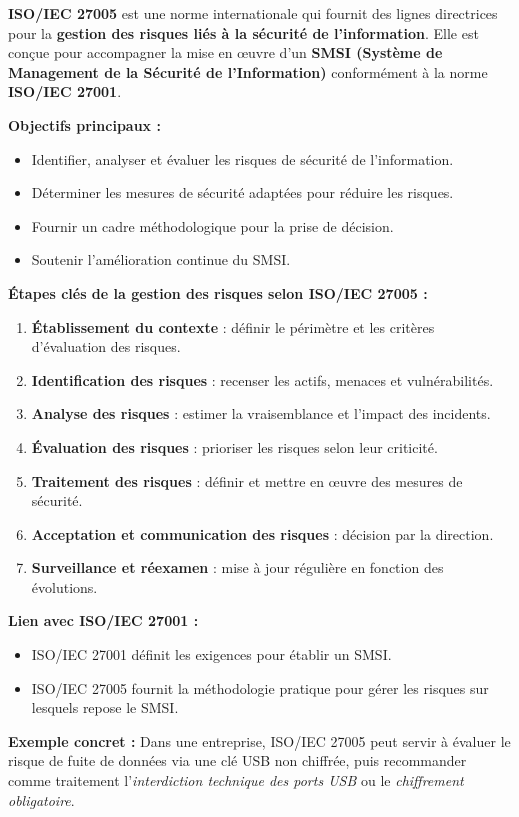 \documentclass[a4paper,11pt]{article}
\begin{document}
\begin{tcolorbox}[colback=teal!5,colframe=teal!60!black,title=Qu'est-ce que l'ISO/IEC 27005 ?]

\textbf{ISO/IEC 27005} est une norme internationale qui fournit des lignes directrices 
pour la \textbf{gestion des risques liés à la sécurité de l’information}.  
Elle est conçue pour accompagner la mise en œuvre d’un \textbf{SMSI (Système de Management de la Sécurité de l’Information)} 
conformément à la norme \textbf{ISO/IEC 27001}.  

\medskip
\textbf{Objectifs principaux :}
\begin{itemize}
  \item Identifier, analyser et évaluer les risques de sécurité de l’information.
  \item Déterminer les mesures de sécurité adaptées pour réduire les risques.
  \item Fournir un cadre méthodologique pour la prise de décision.
  \item Soutenir l’amélioration continue du SMSI.
\end{itemize}

\medskip
\textbf{Étapes clés de la gestion des risques selon ISO/IEC 27005 :}
\begin{enumerate}
  \item \textbf{Établissement du contexte} : définir le périmètre et les critères d’évaluation des risques.
  \item \textbf{Identification des risques} : recenser les actifs, menaces et vulnérabilités.
  \item \textbf{Analyse des risques} : estimer la vraisemblance et l’impact des incidents.
  \item \textbf{Évaluation des risques} : prioriser les risques selon leur criticité.
  \item \textbf{Traitement des risques} : définir et mettre en œuvre des mesures de sécurité.
  \item \textbf{Acceptation et communication des risques} : décision par la direction.
  \item \textbf{Surveillance et réexamen} : mise à jour régulière en fonction des évolutions.
\end{enumerate}

\medskip
\textbf{Lien avec ISO/IEC 27001 :}
\begin{itemize}
  \item ISO/IEC 27001 définit les exigences pour établir un SMSI.
  \item ISO/IEC 27005 fournit la méthodologie pratique pour gérer les risques sur lesquels repose le SMSI.
\end{itemize}

\medskip
\textbf{Exemple concret :}  
Dans une entreprise, ISO/IEC 27005 peut servir à évaluer le risque de fuite de données via une clé USB non chiffrée, 
puis recommander comme traitement l’\textit{interdiction technique des ports USB} ou le \textit{chiffrement obligatoire}.
\end{tcolorbox}
\end{document}
